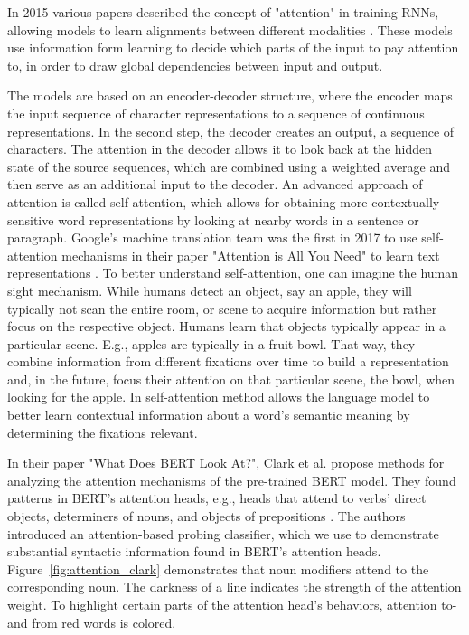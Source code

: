 In 2015 various papers described the concept of "attention" in training RNNs, allowing models to learn alignments between different modalities \cite{mnih2014recurrent, bahdanau2014neural}. These models use information form learning to decide which parts of the input to pay attention to, in order to draw global dependencies between input and output. 

The models are based on an encoder-decoder structure, where the encoder maps the input sequence of character representations to a sequence of continuous representations. In the second step, the decoder creates an output, a sequence of characters. The attention in the decoder allows it to look back at the hidden state of the source sequences, which are combined using a weighted average and then serve as an additional input to the decoder. 
An advanced approach of attention is called self-attention, which allows for obtaining more contextually sensitive word representations by looking at nearby words in a sentence or paragraph. Google's machine translation team was the first in 2017 to use self-attention mechanisms in their paper "Attention is All You Need" to learn text representations \cite{vaswani2017attention}. To better understand self-attention, one can imagine the human sight mechanism. While humans detect an object, say an apple, they will typically not scan the entire room, or scene to acquire information but rather focus on the respective object. Humans learn that objects typically appear in a particular scene. E.g., apples are typically in a fruit bowl. That way, they combine information from different fixations over time to build a representation and, in the future, focus their attention on that particular scene, the bowl, when looking for the apple. In self-attention method allows the language model to better learn contextual information about a word's semantic meaning by determining the fixations relevant. 

In their paper "What Does BERT Look At?", Clark et al. propose methods for analyzing the attention mechanisms of the pre-trained BERT model. They found patterns in BERT's attention heads, e.g., heads that attend to verbs' direct objects, determiners of nouns, and objects of prepositions \cite{clark2019does}. The authors introduced an attention-based probing classifier, which we use to demonstrate substantial syntactic information found in BERT's attention heads. Figure~\ref{fig:attention_clark} demonstrates that noun modifiers attend to the corresponding noun. The darkness of a line indicates the strength of the attention weight. To highlight certain parts of the attention head's behaviors, attention to- and from red words is colored.

